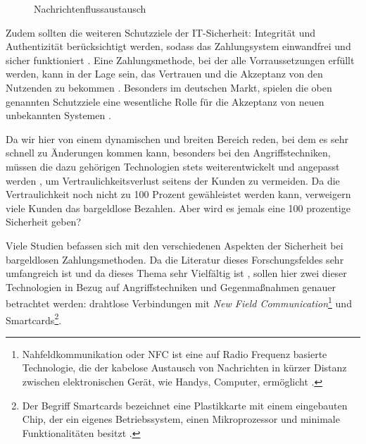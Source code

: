 \vfill
\begin{figure}[H]
    \caption{Nachrichtenflussaustausch \cite{refart:JTAS}}
    \label{fig:refart:JTAS_2}
\end{figure}

Zudem sollten die weiteren Schutzziele der IT-Sicherheit: Integrität und Authentizität berücksichtigt werden, 
sodass das Zahlungsystem einwandfrei und sicher funktioniert \cite{refip:GMPS}. Eine Zahlungsmethode, bei der 
alle Vorraussetzungen erfüllt werden, kann in der Lage sein, das Vertrauen und die Akzeptanz von den Nutzenden 
zu bekommen \cite{refart:HARE}. Besonders im deutschen Markt, spielen die oben genannten Schutzziele eine 
wesentliche Rolle für die Akzeptanz von neuen unbekannten Systemen \cite{refip:DKAM}.

Da wir hier von einem dynamischen und breiten Bereich reden, bei dem es sehr schnell zu Änderungen kommen kann, 
besonders bei den Angriffstechniken, müssen die dazu gehörigen Technologien stets weiterentwickelt und angepasst
werden \cite{refip:NYRS}, um Vertraulichkeitsverlust seitens der Kunden zu vermeiden. Da die Vertraulichkeit noch
nicht zu 100 Prozent gewähleistet werden kann, verweigern viele Kunden das bargeldlose Bezahlen. Aber
wird es jemals eine 100 prozentige Sicherheit geben?

Viele Studien befassen sich mit den verschiedenen Aspekten der Sicherheit bei bargeldlosen Zahlungsmethoden.
Da die Literatur dieses Forschungsfeldes sehr umfangreich ist und da dieses Thema sehr Vielfältig ist 
\cite{refip:GMPS}, sollen hier zwei dieser Technologien in Bezug auf Angriffstechniken und Gegenmaßnahmen 
genauer betrachtet werden: drahtlose Verbindungen mit \textit{New Field Communication}\footnote{Nahfeldkommunikation
oder NFC ist eine auf Radio Frequenz basierte Technologie, die der kabelose Austausch von Nachrichten in kürzer
Distanz zwischen elektronischen Gerät, wie Handys, Computer, ermöglicht \cite{refart:NFNK}.} und Smartcards\footnote{Der
Begriff Smartcards bezeichnet eine Plastikkarte mit einem eingebauten Chip, der ein eigenes Betriebssystem, einen
Mikroprozessor und minimale Funktionalitäten besitzt \cite{refip:JFSB}.}.


